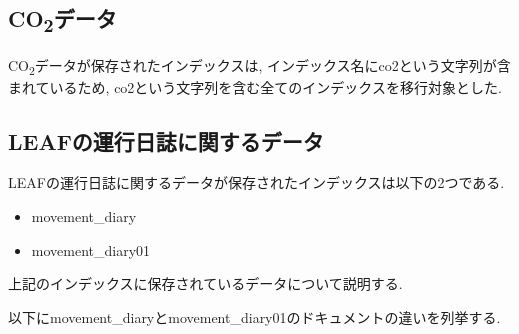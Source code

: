 \subsection{CO\textsubscript{2}データ}

CO\textsubscript{2}データが保存されたインデックスは, インデックス名にco2という文字列が含まれているため, co2という文字列を含む全てのインデックスを移行対象とした.

\subsection{LEAFの運行日誌に関するデータ}

LEAFの運行日誌に関するデータが保存されたインデックスは以下の2つである.

\begin{itemize}
  \item movement\_diary
  \item movement\_diary01
\end{itemize}

上記のインデックスに保存されているデータについて説明する.

以下にmovement\_diaryとmovement\_diary01のドキュメントの違いを列挙する.

